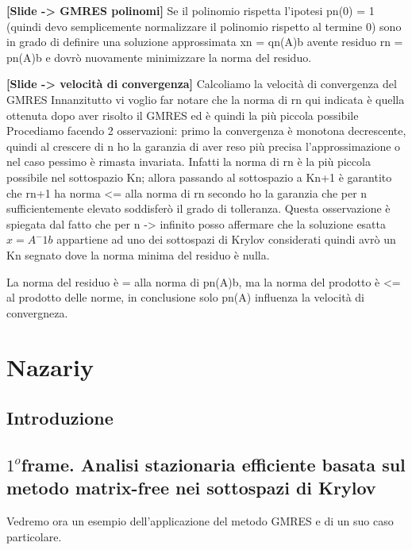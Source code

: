 \documentclass[a4paper]{article}
\begin{document}
\textbf{[Slide -> GMRES polinomi]}
Se il polinomio rispetta l’ipotesi pn(0) = 1 (quindi devo semplicemente normalizzare il polinomio rispetto al termine 0) sono in grado di definire una soluzione approssimata xn = qn(A)b avente residuo rn = pn(A)b e dovrò nuovamente minimizzare la norma del residuo. 

\textbf{[Slide -> velocità di convergenza]}
Calcoliamo la velocità di convergenza del GMRES
Innanzitutto vi voglio far notare che la norma di rn qui indicata è quella ottenuta dopo aver risolto il GMRES ed è quindi la più piccola possibile
Procediamo facendo 2 osservazioni:
primo la convergenza è monotona decrescente, quindi al crescere di n ho la garanzia di aver reso più precisa l’approssimazione o nel caso pessimo è rimasta invariata. Infatti la norma di rn è la più piccola possibile nel sottospazio Kn; allora passando al sottospazio a Kn+1 è garantito che rn+1 ha norma <= alla norma di rn
secondo ho la garanzia che per n sufficientemente elevato soddisferò il grado di tolleranza. Questa osservazione è spiegata dal fatto che per n -> infinito posso affermare che la soluzione esatta $x = A^-1 b$ appartiene ad uno dei sottospazi di Krylov considerati quindi avrò un Kn segnato dove la norma minima del residuo è nulla.

La norma del residuo è = alla norma di pn(A)b, ma la norma del prodotto è <= al prodotto delle norme, in conclusione solo pn(A) influenza la velocità di convergneza.


\section*{Nazariy}
\subsection*{Introduzione}
\subsection*{$1^o$frame. Analisi stazionaria efficiente basata sul metodo matrix-free nei sottospazi di Krylov}
Vedremo ora un esempio dell’applicazione del metodo GMRES e di un suo caso particolare.
\end{document}
